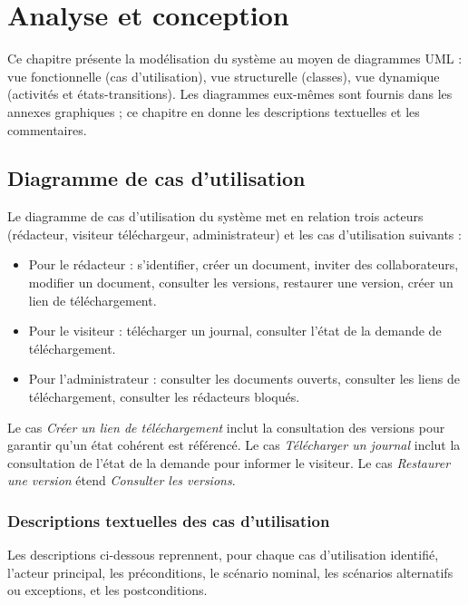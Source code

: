 \chapter{Analyse et conception}

Ce chapitre présente la modélisation du système au moyen de diagrammes UML : vue fonctionnelle (cas d'utilisation), vue structurelle (classes), vue dynamique (activités et états-transitions). Les diagrammes eux-mêmes sont fournis dans les annexes graphiques ; ce chapitre en donne les descriptions textuelles et les commentaires.

\section{Diagramme de cas d'utilisation}

Le diagramme de cas d'utilisation du système met en relation trois acteurs (rédacteur, visiteur téléchargeur, administrateur) et les cas d'utilisation suivants :

\begin{itemize}
    \item Pour le rédacteur : s'identifier, créer un document, inviter des collaborateurs, modifier un document, consulter les versions, restaurer une version, créer un lien de téléchargement.
    \item Pour le visiteur : télécharger un journal, consulter l'état de la demande de téléchargement.
    \item Pour l'administrateur : consulter les documents ouverts, consulter les liens de téléchargement, consulter les rédacteurs bloqués.
\end{itemize}

\begin{infobox}
Le cas \textit{Créer un lien de téléchargement} inclut la consultation des versions pour garantir qu'un état cohérent est référencé. Le cas \textit{Télécharger un journal} inclut la consultation de l'état de la demande pour informer le visiteur. Le cas \textit{Restaurer une version} étend \textit{Consulter les versions}.
\end{infobox}

\subsection{Descriptions textuelles des cas d'utilisation}

Les descriptions ci-dessous reprennent, pour chaque cas d'utilisation identifié, l'acteur principal, les préconditions, le scénario nominal, les scénarios alternatifs ou exceptions, et les postconditions.

